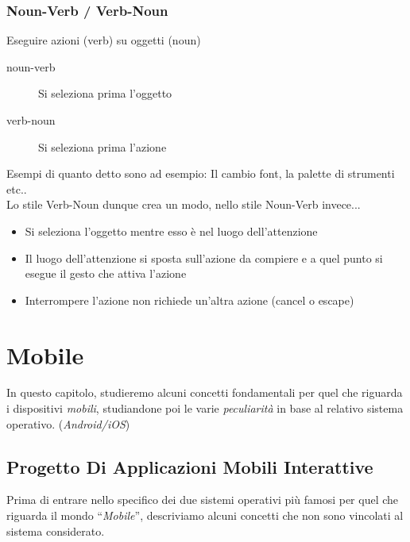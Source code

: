 \documentclass[oneside]{book}
\begin{document}
			\subsection{Noun-Verb / Verb-Noun}\label{sec:nounverb}
			Eseguire azioni (verb) su oggetti (noun)
			\begin{description}
			\item[noun-verb] Si seleziona prima l'oggetto
			\item[verb-noun] Si seleziona prima l'azione
			\end{description}
			Esempi di quanto detto sono ad esempio: Il cambio font, la palette di strumenti etc.. \\
			Lo stile Verb-Noun dunque crea un modo, nello stile Noun-Verb invece...
			\begin{itemize}
			\item Si seleziona l'oggetto mentre esso è nel luogo dell'attenzione
			\item Il luogo dell'attenzione si sposta sull'azione da compiere e a quel punto si esegue il gesto che attiva l'azione
			\item Interrompere l'azione non richiede un'altra azione (cancel o escape)
			\end{itemize}



\chapter{Mobile}
	In questo capitolo, studieremo alcuni concetti fondamentali per quel che riguarda i dispositivi \emph{mobili}, studiandone poi le varie \emph{peculiarità} in base al relativo sistema operativo. (\emph{Android/iOS})

	\section{Progetto Di Applicazioni Mobili Interattive}	
		Prima di entrare nello specifico dei due sistemi operativi più famosi per quel che riguarda il mondo ``\emph{Mobile}'', descriviamo alcuni concetti che non sono vincolati al sistema considerato.
\end{document}
